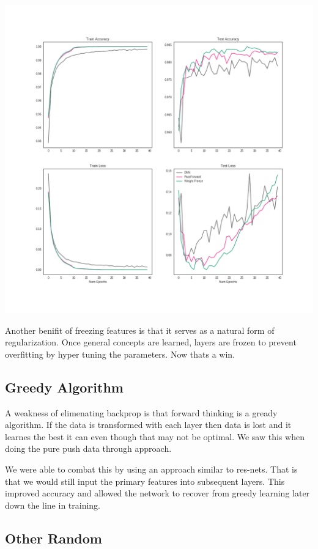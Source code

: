 \documentclass{article}
\begin{document}
\begin{center}
\includegraphics[scale=.32]{comparison}
\end{center}

Another benifit of freezing features is that it serves as a natural form of regularization. Once general concepts are learned, layers are frozen to prevent overfitting by hyper tuning the parameters. Now thats a win.

\subsection{Greedy Algorithm}

A weakness of elimenating backprop is that forward thinking is a gready algorithm. If the data is transformed with each layer then data is lost and it learnes the best it can even though that may not be optimal. We saw this when doing the pure push data through approach.

We were able to combat this by using an approach similar to res-nets. That is that we would still input the primary features into subsequent layers. This improved accuracy and allowed the network to recover from greedy learning later down the line in training.

\subsection{Other Random}
\end{document}
